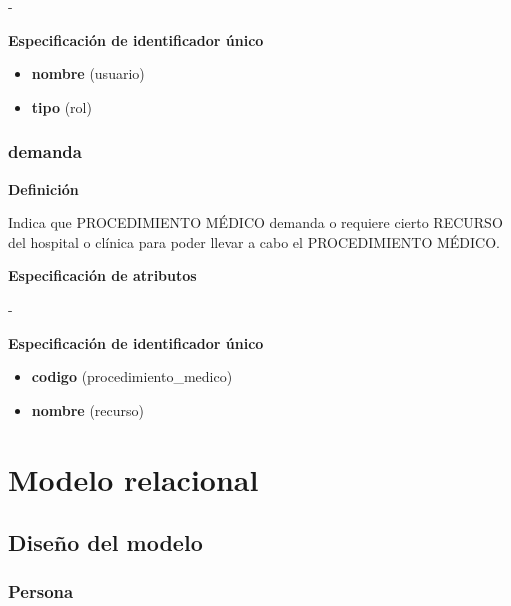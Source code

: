 \documentclass[a4paper,11pt]{article}
\begin{document}
-

\textbf{Especificación de identificador único}

\begin{itemize}

     \item \textbf{nombre} (usuario)

     \item \textbf{tipo} (rol)

\end{itemize}

\subsubsection{\textbf{demanda}}

\textbf{Definición}

Indica que PROCEDIMIENTO MÉDICO demanda o requiere cierto RECURSO del hospital o clínica
para poder llevar a cabo el PROCEDIMIENTO MÉDICO.

\textbf{Especificación de atributos}

-

\textbf{Especificación de identificador único}

\begin{itemize}

     \item \textbf{codigo} (procedimiento\_medico)

     \item \textbf{nombre} (recurso)

\end{itemize}

\newpage

\section{\textbf{Modelo relacional\label{HToc293405831}}}

\subsection{\textbf{Diseño del modelo\label{HToc293405832}}}

\subsubsection{\textbf{Persona}}
\end{document}
